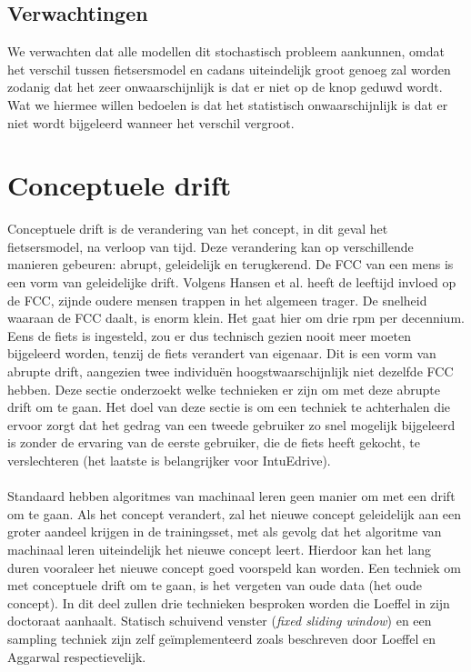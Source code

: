 \subsection{Verwachtingen}
We verwachten dat alle modellen dit stochastisch probleem aankunnen, omdat het verschil tussen fietsersmodel en cadans uiteindelijk groot genoeg zal worden zodanig dat het zeer onwaarschijnlijk is dat er niet op de knop geduwd wordt. Wat we hiermee willen bedoelen is dat het statistisch onwaarschijnlijk is dat er niet wordt bijgeleerd wanneer het verschil vergroot.
\section{Conceptuele drift}
Conceptuele drift is de verandering van het concept, in dit geval het fietsersmodel, na verloop van tijd. Deze verandering kan op verschillende manieren gebeuren: abrupt, geleidelijk en terugkerend. De FCC van een mens is een vorm van geleidelijke drift. Volgens Hansen et al. \cite{factors effecting cadence} heeft de leeftijd invloed op de FCC, zijnde oudere mensen trappen in het algemeen trager. De snelheid waaraan de FCC daalt, is enorm klein. Het gaat hier om drie rpm per decennium. Eens de fiets is ingesteld, zou er dus technisch gezien nooit meer moeten bijgeleerd worden, tenzij de fiets verandert van eigenaar. Dit is een vorm van abrupte drift, aangezien twee individuën hoogstwaarschijnlijk niet dezelfde FCC hebben. Deze sectie onderzoekt welke technieken er zijn om met deze abrupte drift om te gaan. Het doel van deze sectie is om een techniek te achterhalen die ervoor zorgt dat het gedrag van een tweede gebruiker zo snel mogelijk bijgeleerd is zonder de ervaring van de eerste gebruiker, die de fiets heeft gekocht, te verslechteren (het laatste is belangrijker voor IntuEdrive).
\\\\
Standaard hebben algoritmes van machinaal leren geen manier om met een drift om te gaan. Als het concept verandert, zal het nieuwe concept geleidelijk aan een groter aandeel krijgen in de trainingsset, met als gevolg dat het algoritme van machinaal leren uiteindelijk het nieuwe concept leert. Hierdoor kan het lang duren vooraleer het nieuwe concept goed voorspeld kan worden. Een techniek om met conceptuele drift om te gaan, is het vergeten van oude data (het oude concept). In dit deel zullen drie technieken besproken worden die Loeffel \cite{adaptive ml} in zijn doctoraat aanhaalt. Statisch schuivend venster (\textit{fixed sliding window}) en een sampling techniek zijn zelf geïmplementeerd zoals beschreven door Loeffel \cite{adaptive ml} en Aggarwal \cite{biased reservoir sampling} respectievelijk.
